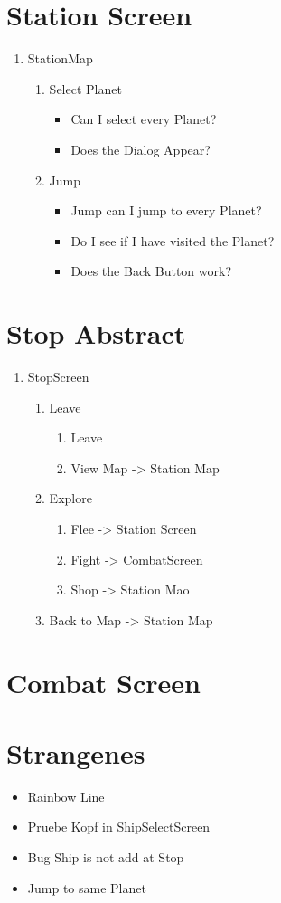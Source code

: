 \documentclass[11pt]{article}
\begin{document}
\section{Station Screen}
\label{sec:orga891bce}
\begin{enumerate}
\item StationMap
\begin{enumerate}
\item Select Planet
\begin{itemize}
\item Can I select every Planet?
\item Does the Dialog Appear?
\end{itemize}
\item Jump
\begin{itemize}
\item Jump can I jump to every Planet?
\item Do I see if I have visited the Planet?
\item Does the Back Button work?
\end{itemize}
\end{enumerate}
\end{enumerate}

\section{Stop Abstract}
\label{sec:org3bde3ec}
\begin{enumerate}
\item StopScreen
\begin{enumerate}
\item Leave
\begin{enumerate}
\item Leave
\item View Map -> Station Map
\end{enumerate}
\item Explore
\begin{enumerate}
\item Flee -> Station Screen
\item Fight -> CombatScreen
\item Shop -> Station Mao
\end{enumerate}
\item Back to Map -> Station Map
\end{enumerate}
\end{enumerate}

\section{Combat Screen}
\label{sec:org9c941a6}





\section{Strangenes}
\label{sec:org4b85c14}
\begin{itemize}
\item Rainbow Line
\item Pruebe Kopf in ShipSelectScreen
\item Bug Ship is not add at Stop
\item Jump to same Planet
\end{itemize}
\end{document}
